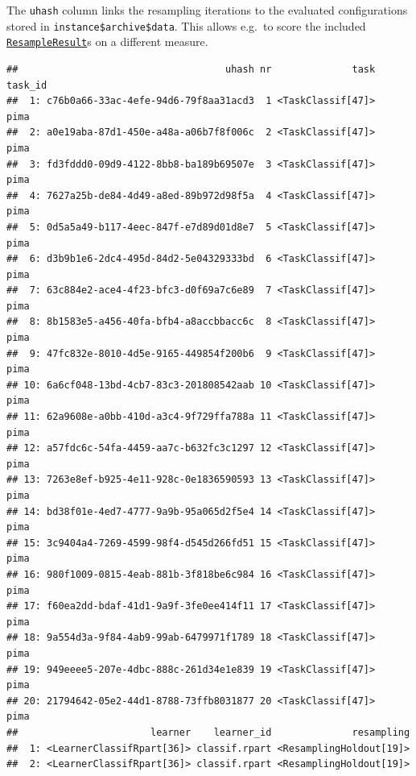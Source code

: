 \documentclass[
]{scrbook}
\newenvironment{Shaded}{\begin{snugshade}}{\end{snugshade}}
\newcommand{\FunctionTok}[1]{\textcolor[rgb]{0.00,0.00,0.00}{#1}}
\newcommand{\NormalTok}[1]{#1}
\newcommand{\SpecialCharTok}[1]{\textcolor[rgb]{0.00,0.00,0.00}{#1}}
\newcommand{\StringTok}[1]{\textcolor[rgb]{0.31,0.60,0.02}{#1}}
\renewenvironment{Shaded} {\begin{snugshade}\small} {\end{snugshade}}
\begin{document}
The \texttt{uhash} column links the resampling iterations to the evaluated configurations stored in \texttt{instance\$archive\$data}. This allows e.g.~to score the included \href{https://mlr3.mlr-org.com/reference/ResampleResult.html}{\texttt{ResampleResult}}s on a different measure.

\begin{Shaded}
\end{Shaded}

\begin{verbatim}
##                                    uhash nr              task task_id
##  1: c76b0a66-33ac-4efe-94d6-79f8aa31acd3  1 <TaskClassif[47]>    pima
##  2: a0e19aba-87d1-450e-a48a-a06b7f8f006c  2 <TaskClassif[47]>    pima
##  3: fd3fddd0-09d9-4122-8bb8-ba189b69507e  3 <TaskClassif[47]>    pima
##  4: 7627a25b-de84-4d49-a8ed-89b972d98f5a  4 <TaskClassif[47]>    pima
##  5: 0d5a5a49-b117-4eec-847f-e7d89d01d8e7  5 <TaskClassif[47]>    pima
##  6: d3b9b1e6-2dc4-495d-84d2-5e04329333bd  6 <TaskClassif[47]>    pima
##  7: 63c884e2-ace4-4f23-bfc3-d0f69a7c6e89  7 <TaskClassif[47]>    pima
##  8: 8b1583e5-a456-40fa-bfb4-a8accbbacc6c  8 <TaskClassif[47]>    pima
##  9: 47fc832e-8010-4d5e-9165-449854f200b6  9 <TaskClassif[47]>    pima
## 10: 6a6cf048-13bd-4cb7-83c3-201808542aab 10 <TaskClassif[47]>    pima
## 11: 62a9608e-a0bb-410d-a3c4-9f729ffa788a 11 <TaskClassif[47]>    pima
## 12: a57fdc6c-54fa-4459-aa7c-b632fc3c1297 12 <TaskClassif[47]>    pima
## 13: 7263e8ef-b925-4e11-928c-0e1836590593 13 <TaskClassif[47]>    pima
## 14: bd38f01e-4ed7-4777-9a9b-95a065d2f5e4 14 <TaskClassif[47]>    pima
## 15: 3c9404a4-7269-4599-98f4-d545d266fd51 15 <TaskClassif[47]>    pima
## 16: 980f1009-0815-4eab-881b-3f818be6c984 16 <TaskClassif[47]>    pima
## 17: f60ea2dd-bdaf-41d1-9a9f-3fe0ee414f11 17 <TaskClassif[47]>    pima
## 18: 9a554d3a-9f84-4ab9-99ab-6479971f1789 18 <TaskClassif[47]>    pima
## 19: 949eeee5-207e-4dbc-888c-261d34e1e839 19 <TaskClassif[47]>    pima
## 20: 21794642-05e2-44d1-8788-73ffb8031877 20 <TaskClassif[47]>    pima
##                       learner    learner_id              resampling
##  1: <LearnerClassifRpart[36]> classif.rpart <ResamplingHoldout[19]>
##  2: <LearnerClassifRpart[36]> classif.rpart <ResamplingHoldout[19]>

\end{verbatim}
\end{document}
